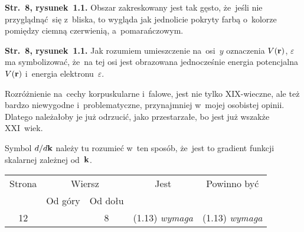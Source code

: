 \documentclass[a4paper,11pt]{article}
\numberwithin{equation}{section}
\begin{document}
\vspace{0em}


\noindent
\textbf{Str.~8, rysunek~1.1.} Obszar zakreskowany jest tak gęsto,
że~jeśli nie przyglądnąć~się z~bliska, to wygląda jak jednolicie
pokryty farbą o~kolorze pomiędzy ciemną czerwienią, a~pomarańczowym.

\VerSpaceFour





\noindent
\textbf{Str.~8, rysunek~1.1.} Jak rozumiem umieszczenie na~osi~$y$
oznaczenia $V( \mathbf{r} )$, $\varepsilon$ ma symbolizować, że~na tej osi jest
obrazowana jednocześnie energia potencjalna $V( \mathbf{r} )$ i~energia
elektronu~$\varepsilon$.

\VerSpaceFour





\noindent
{} Rozróżnienie na~cechy korpuskularne i~falowe, jest nie tylko
XIX-wieczne, ale też bardzo niewygodne i~problematyczne, przynajmniej
w~mojej osobistej opinii. Dlatego należałoby je już odrzucić, jako
przestarzałe, bo jest już wszakże XXI~wiek.

\VerSpaceFour





\noindent
{} Symbol $d / d\mathbf{k}$ należy tu rozumieć w~ten sposób,
że~jest to gradient funkcji skalarnej zależnej od~$\mathbf{k}$.






\newpage



\begin{center}

  \begin{tabular}{|c|c|c|c|c|}
    \hline
    Strona & \multicolumn{2}{c|}{Wiersz} & Jest
                              & Powinno być \\ \cline{2-3}
    & Od góry & Od dołu & & \\ \hline
    12 & & 8 & (1.13){ }{ }\textit{wymaga} & (1.13) \textit{wymaga} \\
    \hline
  \end{tabular}

\end{center}
\end{document}
